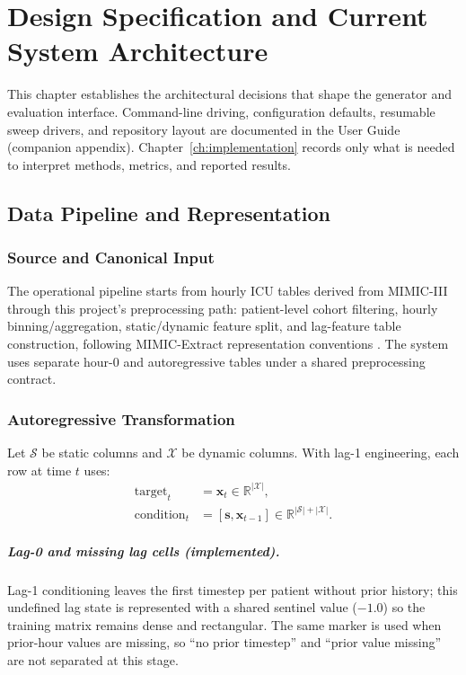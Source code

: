 \chapter{Design Specification and Current System Architecture}
\label{ch:design}

This chapter establishes the architectural decisions that shape the generator and evaluation interface. Command-line driving, configuration defaults, resumable sweep drivers, and repository layout are documented in the User Guide (companion appendix). Chapter~\ref{ch:implementation} records only what is needed to interpret methods, metrics, and reported results.

\section{Data Pipeline and Representation}

\subsection{Source and Canonical Input}
\label{sec:mimic-preprocess-contract}

The operational pipeline starts from hourly ICU tables derived from MIMIC-III \cite{johnson2016mimic}
through this project's preprocessing path: patient-level cohort filtering, hourly
binning/aggregation, static/dynamic feature split, and lag-feature table
construction, following MIMIC-Extract representation conventions
\cite{wang2020mimicextract}. The system uses separate hour-0 and autoregressive tables under a shared preprocessing contract.

\subsection{Autoregressive Transformation}

Let $\mathcal{S}$ be static columns and $\mathcal{X}$ be dynamic columns.
With lag-1 engineering, each row at time $t$ uses:
\begin{align}
\text{target}_t &= \mathbf{x}_t \in \mathbb{R}^{|\mathcal{X}|}, \\
\text{condition}_t &= [\mathbf{s}, \mathbf{x}_{t-1}] \in \mathbb{R}^{|\mathcal{S}|+|\mathcal{X}|}.
\end{align}

\paragraph{Lag-0 and missing lag cells (implemented).}
Lag-1 conditioning leaves the first timestep per patient without prior history; this undefined lag state is represented with a shared sentinel value ($-1.0$) so the training matrix remains dense and rectangular. The same marker is used when prior-hour values are missing, so ``no prior timestep'' and ``prior value missing'' are not separated at this stage.

